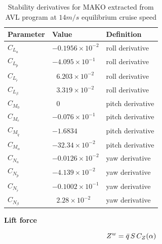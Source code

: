 \begin{table}
\label{arm:momentsMAKO}
\caption{Stability derivatives for MAKO extracted from AVL program at $14 m/s$ equilibrium cruise speed \cite{bronz2016aerodynamic}}
\label{arm:MAKO}
\begin{center}
\begin{tabular}{ ||p{3cm}|p{3cm}|p{3cm}||}\hline
\textbf{Parameter} & \textbf{Value} & \textbf{Definition} \\\hline
$C_{L_a}$                             & $-0.1956 \times 10^{-2}$	   & roll derivative \\\hline
$C_{L_{\tilde{p}}}$                 & $-4.095 \times 10^{-1}$	   & roll derivative \\\hline
$C_{L_{\tilde{r}}} $                 & $\ \ \, 6.203 \times 10^{-2}$     & roll derivative \\\hline
$C_{L_\beta}$                        & $\ \ \, 3.319 \times 10^{-2}$	   & roll derivative \\\hline
$C_{M_0}$ 			     & $\ \ \, 0$  &  pitch derivative \\\hline
$C_{M_e}$ 			     & $-0.076 \times 10^{-1}$  &  pitch derivative \\\hline
$C_{M_{\tilde{q}}} $               & $-1.6834$	                            & pitch derivative \\\hline
$C_{M_\alpha} $                    & $-32.34 \times 10^{-2}$ 	   & pitch derivative \\\hline
$C_{N_a}$                             & $-0.0126 \times 10^{-2}$	   & yaw derivative \\\hline
$C_{N_{\tilde{p}}}$                 & $-4.139 \times 10^{-2}$ 	   & yaw derivative \\\hline
$C_{N_{\tilde{r}}}$                 & $-0.1002 \times 10^{-1}$	   & yaw derivative \\\hline
$C_{N_\beta} $                      & $\ \ \, 2.28 \times 10^{-2}$	   & yaw derivative \\\hline
\end{tabular}
\end{center}
\end{table}





\textbf{Lift force}

\begin{equation}{\label{eqn:liftForce}}
Z^w = \bar{q} \, S \,  C_Z(\alpha)
\end{equation}

